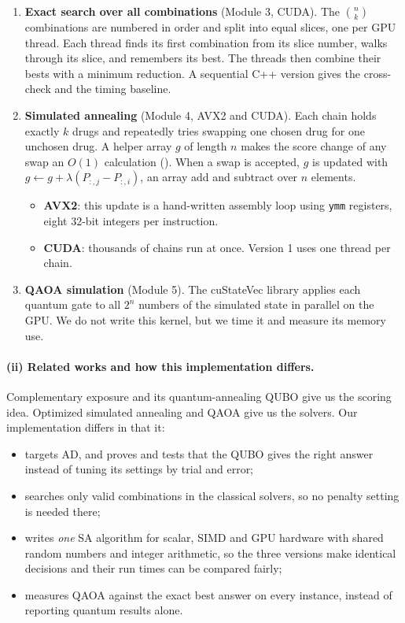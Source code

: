 \begin{enumerate}
\item \textbf{Exact search over all combinations} (Module 3, CUDA). The $\binom{n}{k}$ combinations are numbered in order and split into equal slices, one per GPU thread. Each thread finds its first combination from its slice number, walks through its slice, and remembers its best. The threads then combine their bests with a minimum reduction. A sequential C++ version gives the cross-check and the timing baseline.
\item \textbf{Simulated annealing} (Module 4, AVX2 and CUDA). Each chain holds exactly $k$ drugs and repeatedly tries swapping one chosen drug for one unchosen drug. A helper array $g$ of length $n$ makes the score change of any swap an $O(1)$ calculation (). When a swap is accepted, $g$ is updated with $g \leftarrow g + \lambda(P_{:,j}-P_{:,i})$, an array add and subtract over $n$ elements.
\begin{itemize}
\item \textbf{AVX2}: this update is a hand-written assembly loop using \texttt{ymm} registers, eight 32-bit integers per instruction.
\item \textbf{CUDA}: thousands of chains run at once. Version 1 uses one thread per chain.
\end{itemize}
\item \textbf{QAOA simulation} (Module 5). The cuStateVec library applies each quantum gate to all $2^n$ numbers of the simulated state in parallel on the GPU. We do not write this kernel, but we time it and measure its memory use.
\end{enumerate}

\paragraph{(ii) Related works and how this implementation differs.} Complementary exposure \cite{cheng2019combinations} and its quantum-annealing QUBO \cite{ramos2025quantum} give us the scoring idea. Optimized simulated annealing \cite{isakov2015optimised} and QAOA \cite{farhi2014qaoa} give us the solvers. Our implementation differs in that it:
\begin{itemize}
\item targets AD, and proves and tests that the QUBO gives the right answer instead of tuning its settings by trial and error;
\item searches only valid combinations in the classical solvers, so no penalty setting is needed there;
\item writes \emph{one} SA algorithm for scalar, SIMD and GPU hardware with shared random numbers and integer arithmetic, so the three versions make identical decisions and their run times can be compared fairly;
\item measures QAOA against the exact best answer on every instance, instead of reporting quantum results alone.
\end{itemize}

